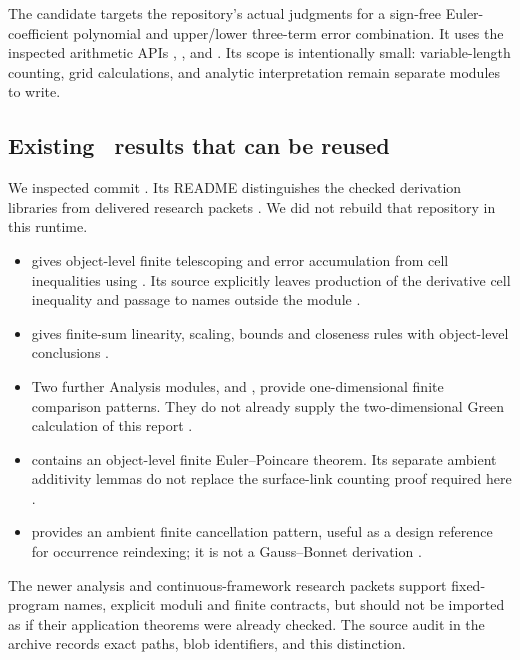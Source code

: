 The candidate  targets the repository's actual  judgments for a sign-free Euler-coefficient polynomial and upper/lower three-term error combination. It uses the inspected arithmetic APIs , , and . Its scope is intentionally small: variable-length counting, grid calculations, and analytic interpretation remain separate modules to write.

\subsection{Existing \repo\ results that can be reused}

We inspected commit . Its README distinguishes the checked derivation libraries from delivered research packets \cite{repo-readme}. We did not rebuild that repository in this runtime.

\begin{itemize}
\item {} gives object-level finite telescoping and error accumulation from cell inequalities using . Its source explicitly leaves production of the derivative cell inequality and passage to names outside the module \cite{repo-ftc}.
\item {} gives finite-sum linearity, scaling, bounds and closeness rules with object-level conclusions \cite{repo-sums}.
\item Two further Analysis modules,  and , provide one-dimensional finite comparison patterns. They do not already supply the two-dimensional Green calculation of this report \cite{repo-grid}.
\item {} contains an object-level finite Euler--Poincare theorem. Its separate ambient additivity lemmas do not replace the surface-link counting proof required here \cite{repo-euler}.
\item {} provides an ambient finite cancellation pattern, useful as a design reference for occurrence reindexing; it is not a Gauss--Bonnet derivation \cite{repo-boundary}.
\end{itemize}

The newer analysis and continuous-framework research packets support fixed-program names, explicit moduli and finite contracts, but should not be imported as if their application theorems were already checked. The source audit in the archive records exact paths, blob identifiers, and this distinction.

